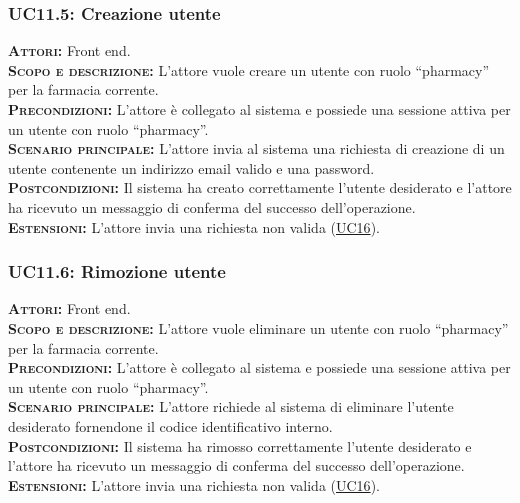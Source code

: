 \subsubsection{UC11.5: Creazione utente}
\label{sec:UC115}
\textsc{\textbf{Attori:}} Front end.\\
\textsc{\textbf{Scopo e descrizione:}} L'attore vuole creare un utente con ruolo ``pharmacy'' per la farmacia corrente.\\
\textsc{\textsc{\textbf{Precondizioni:}}} L'attore è collegato al sistema e possiede una sessione attiva per un utente con ruolo ``pharmacy''.\\
\textsc{\textbf{Scenario principale:}} L'attore invia al sistema una richiesta di creazione di un utente contenente un indirizzo email valido e una password.\\
\textsc{\textbf{Postcondizioni:}} Il sistema ha creato correttamente l'utente desiderato e l'attore ha ricevuto un messaggio di conferma del successo dell'operazione.\\
\textsc{\textbf{Estensioni:}} L'attore invia una richiesta non valida (\hyperref[sec:UC16]{UC16}).

\subsubsection{UC11.6: Rimozione utente}
\label{sec:UC116}
\textsc{\textbf{Attori:}} Front end.\\
\textsc{\textbf{Scopo e descrizione:}} L'attore vuole eliminare un utente con ruolo ``pharmacy'' per la farmacia corrente.\\
\textsc{\textsc{\textbf{Precondizioni:}}} L'attore è collegato al sistema e possiede una sessione attiva per un utente con ruolo ``pharmacy''.\\
\textsc{\textbf{Scenario principale:}} L'attore richiede al sistema di eliminare l'utente desiderato fornendone il codice identificativo interno.\\
\textsc{\textbf{Postcondizioni:}} Il sistema ha rimosso correttamente l'utente desiderato e l'attore ha ricevuto un messaggio di conferma del successo dell'operazione.\\
\textsc{\textbf{Estensioni:}} L'attore invia una richiesta non valida (\hyperref[sec:UC16]{UC16}).

